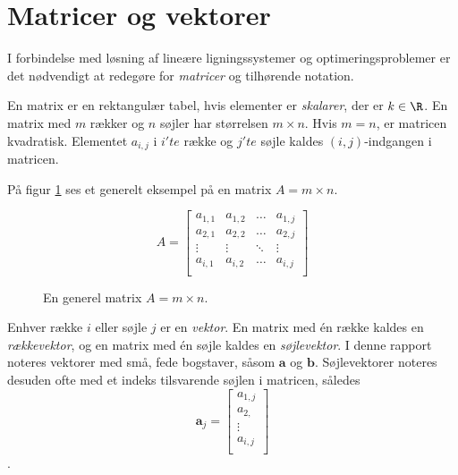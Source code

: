 \section{Matricer og vektorer}


I forbindelse med løsning af lineære ligningssystemer og optimeringsproblemer er det nødvendigt at redegøre for \textit{matricer} og tilhørende notation. 

\begin{defn}{}{}
En matrix er en rektangulær tabel, hvis elementer er \textit{skalarer}, der er $k \in \R$. 
En matrix med $m$ rækker og $n$ søjler har størrelsen $m \times n$.
Hvis $m=n$, er matricen kvadratisk. 
Elementet $a_{i,j}$ i $i'te$ række og $j'te$ søjle kaldes $(i,j)$-indgangen i matricen. 
\end{defn}


På figur \ref{fig:matrix_gen_eks} ses et generelt eksempel på en matrix $A = m \times n$.

\begin{figure}[H]
	\begin{center}
$$
A=
\begin{bmatrix}
a_{1,1} & a_{1,2} & \ldots & a_{1,j} \\
a_{2,1} & a_{2,2} & \ldots & a_{2,j} \\
\vdots  & \vdots  & \ddots & \vdots \\
a_{i,1} & a_{i,2} & \ldots & a_{i,j} \\
\end{bmatrix}
$$
	\end{center}
	\caption{En generel matrix $A=m \times n$.}
	\label{fig:matrix_gen_eks}
\end{figure}

Enhver række $i$ eller søjle $j$ er en \textit{vektor}. En matrix med én række kaldes en \textit{rækkevektor}, og en matrix med én søjle kaldes en \textit{søjlevektor}. I denne rapport noteres vektorer med små, fede bogstaver, såsom $\textbf{a}$ og $\textbf{b}$. Søjlevektorer noteres desuden ofte med et indeks tilsvarende søjlen i matricen, således 
$$
\textbf{a}_j= 
\begin{bmatrix}
a_{1,j} \\
a_{2,} \\
\vdots \\
a_{i,j} \\
\end{bmatrix}
$$. 










